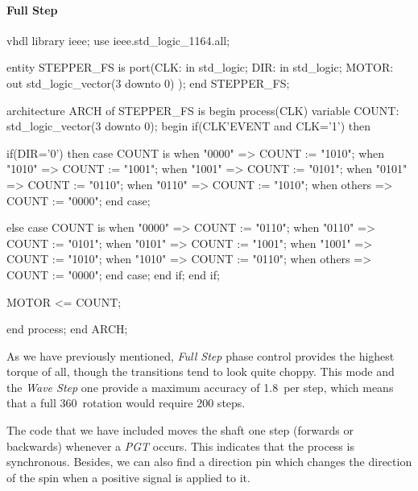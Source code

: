 \paragraph{Full Step}
\label{sec:FULL_STEP}

\begin{code}{vhdl}
library ieee;
use ieee.std_logic_1164.all;

entity STEPPER_FS is
  port(CLK: in std_logic;
       DIR: in std_logic;
       MOTOR: out std_logic_vector(3 downto 0)
       );
end STEPPER_FS;

architecture ARCH of STEPPER_FS is
  begin
    process(CLK)
      variable COUNT: std_logic_vector(3 downto 0);
        begin
          if(CLK'EVENT and CLK='1') then

            if(DIR='0') then
              case COUNT is
                when "0000" => COUNT := "1010";
                when "1010" => COUNT := "1001";
                when "1001" => COUNT := "0101";
                when "0101" => COUNT := "0110";
                when "0110" => COUNT := "1010";
                when others => COUNT := "0000";
              end case;
              
              
              
                else
                  case COUNT is
                    when "0000" => COUNT := "0110";
                    when "0110" => COUNT := "0101";
                    when "0101" => COUNT := "1001";
                    when "1001" => COUNT := "1010";
                    when "1010" => COUNT := "0110";
                    when others => COUNT := "0000";
                  end case;
            end if;
          end if;
        
          MOTOR <= COUNT;
          
    end process;
end ARCH;
\end{code}

As we have previously mentioned, \textit{Full Step} phase control provides the highest torque of all, though the transitions tend to look quite choppy. This mode and the \textit{Wave Step} one provide a maximum accuracy of 1.8\textdegree \, per step, which means that a full 360\textdegree \, rotation would require 200 steps.\medskip

The code that we have included moves the shaft one step (forwards or backwards) whenever a \textit{PGT} occurs. This indicates that the process is synchronous. Besides, we can also find a direction pin which changes the direction of the spin when a positive signal is applied to it.

